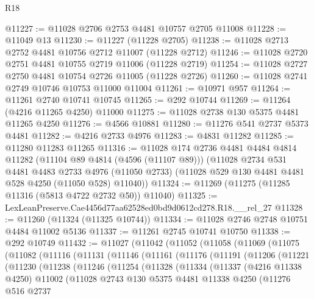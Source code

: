 \begin{lexlean}{R18}
\begin{coremodule}
@11227 := @11028 @2706 @2753 @4481 @10757 @2705 @11008
@11228 := @11049 @13
@11230 := @11227 (@11228 @2705)
@11238 := @11028 @2713 @2752 @4481 @10756 @2712 @11007 (@11228 @2712)
@11246 := @11028 @2720 @2751 @4481 @10755 @2719 @11006 (@11228 @2719)
@11254 := @11028 @2727 @2750 @4481 @10754 @2726 @11005 (@11228 @2726)
@11260 := @11028 @2741 @2749 @10746 @10753 @11000 @11004
@11261 := @10971 @957
@11264 := @11261 @2740 @10741 @10745
@11265 := @292 @10744
@11269 := @11264 (@4216 @11265 @4250) @11000
@11275 := @11028 @2738 @130 @5375 @4481 @11265 @4250
@11276 := @4566 @10881
@11280 := @11276 @541 @2737 @5373 @4481
@11282 := @4216 @2733 @4976
@11283 := @4831 @11282
@11285 := @11280 @11283 @11265
@11316 := @11028
    @174
    @2736
    @4481
    @4484
    @4814
    @11282
    (@11104 @89 @4814 (@4596 (@11107 @89)))
    (@11028
      @2734
      @531
      @4481
      @4483
      @2733
      @4976
      (@11050 @2733)
      (@11028 @529 @130 @4481 @4481 @528 @4250 (@11050 @528) @11040))
@11324 := @11269 (@11275 (@11285 @11316 (@5813 @4722 @2732 @50)) @11040)
@11325 := LexLeanPreserve.Cae4456d77aa62528ed0bd9d0612cd278.R18.__rel_27
@11328 := @11260 (@11324 (@11325 @10744))
@11334 := @11028 @2746 @2748 @10751 @4484 @11002 @5136
@11337 := @11261 @2745 @10741 @10750
@11338 := @292 @10749
@11432 := @11027
    (@11042
      (@11052
        (@11058
          (@11069
            (@11075
              (@11082
                (@11116
                  (@11131
                    (@11146
                      (@11161
                        (@11176
                          (@11191
                            (@11206
                              (@11221
                                (@11230
                                  (@11238
                                    (@11246
                                      (@11254
                                        (@11328
                                          (@11334
                                            (@11337
                                              (@4216 @11338 @4250)
                                              @11002
                                              (@11028
                                                @2743
                                                @130
                                                @5375
                                                @4481
                                                @11338
                                                @4250
                                                (@11276
                                                  @516
                                                  @2737

\end{coremodule}
\end{lexlean}
